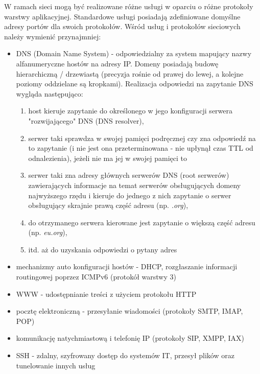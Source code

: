 \documentclass{pdfBooklets}
\begin{document}
W ramach sieci mogą być realizowane różne usługi w oparciu o różne protokoły warstwy aplikacyjnej. Standardowe usługi posiadają zdefiniowane domyślne adresy portów dla swoich protokołów. Wśród usług i protokołów sieciowych należy wymienić przynajmniej:
\begin{itemize}
	\item DNS (Domain Name System) - odpowiedzialny za system mapujący nazwy alfanumeryczne hostów na adresy IP.
		Domeny posiadają budowę hierarchiczną / drzewiastą (precyzja rośnie od prawej do lewej, a kolejne poziomy oddzielane są kropkami).
		Realizacja odpowiedzi na zapytanie DNS wygląda następująco:
		\begin{enumerate}
			\item host kieruje zapytanie do określonego w jego konfiguracji serwera "rozwijającego" DNS (DNS resolver),
			\item serwer taki sprawdza w swojej pamięci podręcznej czy zna odpowiedź na to zapytanie (i nie jest ona przeterminowana - nie upłynął czas TTL od odnalezienia), jeżeli nie ma jej w swojej pamięci to
			\item serwer taki zna adresy głównych serwerów DNS (root serwerów) zawierających informacje na temat serwerów obsługujących domeny najwyższego rzędu i kieruje do jednego z nich zapytanie o serwer obsługujący skrajnie prawą część adresu (np. \textit{.org}),
			\item do otrzymanego serwera kierowane jest zapytanie o większą część adresu (np. \textit{eu.org}),
			\item itd. aż do uzyskania odpowiedzi o pytany adres
		\end{enumerate}
	\item mechanizmy auto konfiguracji hostów - DHCP, rozgłaszanie informacji routingowej poprzez ICMPv6 (protokół warstwy 3)
	\item WWW - udostępnianie treści z użyciem protokołu HTTP
	\item pocztę elektroniczną - przesyłanie wiadomości (protokoły SMTP, IMAP, POP)
	\item komunikację natychmiastową i telefonię IP (protokoły SIP, XMPP, IAX)
	\item SSH - zdalny, szyfrowany dostęp do systemów IT, przesył plików oraz tunelowanie innych usług
\end{itemize}

\end{document}
